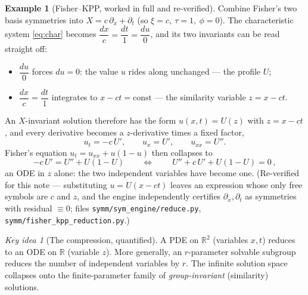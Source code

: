 \documentclass[11pt]{article}
\theoremstyle{definition}
\newtheorem{example}{Example}[section]
\theoremstyle{remark}
\newtheorem*{keyidea}{Key idea}
\newcommand{\R}{\mathbb{R}}
\begin{document}
\begin{example}[Fisher--KPP, worked in full and re-verified]\label{ex:fisher-collapse}
Combine Fisher's two basis symmetries into $X=c\,\partial_x+\partial_t$ (so $\xi=c,\ \tau=1,\ \phi=0$).
The characteristic system \eqref{eq:char} becomes $\dfrac{dx}{c}=\dfrac{dt}{1}=\dfrac{du}{0}$, and its
two invariants can be read straight off:
\begin{itemize}[nosep]
  \item $\dfrac{du}{0}$ forces $du=0$: the value $u$ rides along unchanged --- the profile $U$;
  \item $\dfrac{dx}{c}=\dfrac{dt}{1}$ integrates to $x-ct=\text{const}$ --- the similarity variable $z=x-ct$.
\end{itemize}
An $X$-invariant solution therefore has the form $u(x,t)=U(z)$ with $z=x-ct$, and every derivative
becomes a $z$-derivative times a fixed factor,
\[
u_t=-c\,U',\qquad u_x=U',\qquad u_{xx}=U'' .
\]
Fisher's equation $u_t=u_{xx}+u(1-u)$ then collapses to
\[
-c\,U'=U''+U(1-U)\qquad\Longleftrightarrow\qquad \boxed{\,U''+c\,U'+U(1-U)=0\,,}
\]
an ODE in $z$ alone: the two independent variables have become one. (Re-verified for this note ---
substituting $u=U(x-ct)$ leaves an expression whose only free symbols are $c$ and $z$, and the engine
independently certifies $\partial_x,\partial_t$ as symmetries with residual $\equiv0$; files
\texttt{symm/sym\_engine/reduce.py}, \texttt{symm/fisher\_kpp\_reduction.py}.)
\end{example}

\begin{keyidea}[The compression, quantified]
A PDE on $\R^2$ (variables $x,t$) reduces to an ODE on $\R$ (variable $z$). More generally, an
$r$-parameter solvable subgroup reduces the number of independent variables by $r$. The infinite solution
space collapses onto the finite-parameter family of \emph{group-invariant} (similarity) solutions.
\end{keyidea}
\end{document}
